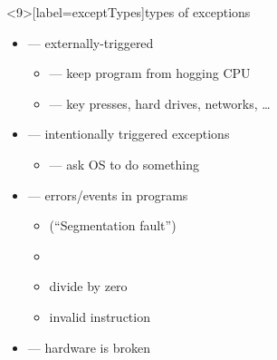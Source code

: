 \begin{frame}<9>[label=exceptTypes]{types of exceptions}
\begin{itemize}
\item {} --- externally-triggered
    \begin{itemize}
    \item {} --- keep program from hogging CPU
    \item {} --- key presses, hard drives, networks, \ldots
    \end{itemize}
\item {} --- intentionally triggered exceptions
    \begin{itemize}
    \item {} --- ask OS to do something
    \end{itemize}
\item {} --- errors/events in programs
    \begin{itemize}
        \item {} (``Segmentation fault'')
        \item {}
    \item divide by zero
    \item invalid instruction
    \end{itemize}
\item {} --- hardware is broken
\end{itemize}
\end{frame}
